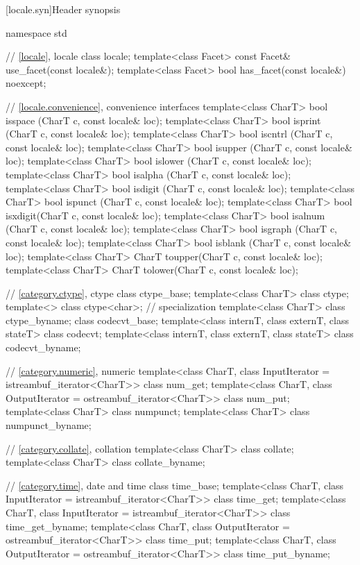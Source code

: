 [locale.syn]{Header  synopsis}

%
\begin{codeblock}
namespace std {
  // \ref{locale}, locale
  class locale;
  template<class Facet> const Facet& use_facet(const locale&);
  template<class Facet> bool         has_facet(const locale&) noexcept;

  // \ref{locale.convenience}, convenience interfaces
  template<class CharT> bool isspace (CharT c, const locale& loc);
  template<class CharT> bool isprint (CharT c, const locale& loc);
  template<class CharT> bool iscntrl (CharT c, const locale& loc);
  template<class CharT> bool isupper (CharT c, const locale& loc);
  template<class CharT> bool islower (CharT c, const locale& loc);
  template<class CharT> bool isalpha (CharT c, const locale& loc);
  template<class CharT> bool isdigit (CharT c, const locale& loc);
  template<class CharT> bool ispunct (CharT c, const locale& loc);
  template<class CharT> bool isxdigit(CharT c, const locale& loc);
  template<class CharT> bool isalnum (CharT c, const locale& loc);
  template<class CharT> bool isgraph (CharT c, const locale& loc);
  template<class CharT> bool isblank (CharT c, const locale& loc);
  template<class CharT> CharT toupper(CharT c, const locale& loc);
  template<class CharT> CharT tolower(CharT c, const locale& loc);

  // \ref{category.ctype}, ctype
  class ctype_base;
  template<class CharT> class ctype;
  template<>            class ctype<char>;      // specialization
  template<class CharT> class ctype_byname;
  class codecvt_base;
  template<class internT, class externT, class stateT> class codecvt;
  template<class internT, class externT, class stateT> class codecvt_byname;

  // \ref{category.numeric}, numeric
  template<class CharT, class InputIterator = istreambuf_iterator<CharT>>
    class num_get;
  template<class CharT, class OutputIterator = ostreambuf_iterator<CharT>>
    class num_put;
  template<class CharT>
    class numpunct;
  template<class CharT>
    class numpunct_byname;

  // \ref{category.collate}, collation
  template<class CharT> class collate;
  template<class CharT> class collate_byname;

  // \ref{category.time}, date and time
  class time_base;
  template<class CharT, class InputIterator = istreambuf_iterator<CharT>>
    class time_get;
  template<class CharT, class InputIterator = istreambuf_iterator<CharT>>
    class time_get_byname;
  template<class CharT, class OutputIterator = ostreambuf_iterator<CharT>>
    class time_put;
  template<class CharT, class OutputIterator = ostreambuf_iterator<CharT>>
    class time_put_byname;

}
\end{codeblock}
